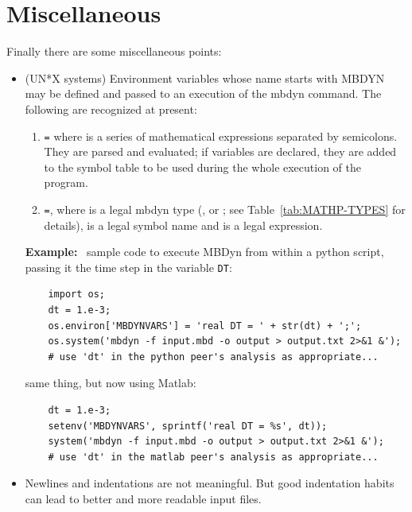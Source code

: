 \section{Miscellaneous}
Finally there are some miscellaneous points:
\begin{itemize}
    \item (UN*X systems) Environment variables whose name starts with MBDYN may
    be defined and passed to an execution of the mbdyn command.
    The following are recognized at present:
  
    \begin{enumerate}
  
        \item \texttt{=}
	where  is a series of mathematical expressions
	separated by semicolons. 
	They are parsed and evaluated; if variables are declared, they are
	added to the symbol table to be used during the whole execution 
	of the program.
    
        \item \texttt{=},
	where  is a legal mbdyn type (, 
	or ; see Table~\ref{tab:MATHP-TYPES} for details),
	 is a legal symbol name and  is a legal
	expression.
    
    \end{enumerate}

    \textbf{Example:} \
    sample code to execute MBDyn from within a python script,
    passing it the time step in the  variable \texttt{DT}:
\begin{verbatim}
    import os;
    dt = 1.e-3;
    os.environ['MBDYNVARS'] = 'real DT = ' + str(dt) + ';';
    os.system('mbdyn -f input.mbd -o output > output.txt 2>&1 &');
    # use 'dt' in the python peer's analysis as appropriate...
\end{verbatim}

    same thing, but now using Matlab:
\begin{verbatim}
    dt = 1.e-3;
    setenv('MBDYNVARS', sprintf('real DT = %s', dt));
    system('mbdyn -f input.mbd -o output > output.txt 2>&1 &');
    # use 'dt' in the matlab peer's analysis as appropriate...
\end{verbatim}

    \item Newlines and indentations are not meaningful. But good indentation
    habits can lead to better and more readable input files.
    

\end{itemize}
